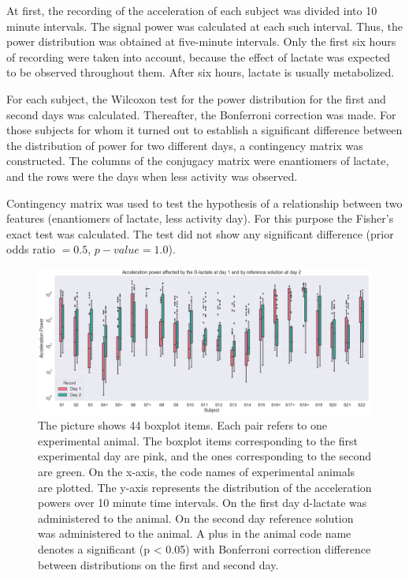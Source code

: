 \documentclass[14pt,a4paper]{scrartcl}
\begin{document}
At first, the recording of the acceleration of each subject was divided into 10 minute intervals. The signal power was calculated at each such interval. Thus, the power distribution was obtained at five-minute intervals. Only the first six hours of recording were taken into account, because the effect of lactate was expected to be observed throughout them. After six hours, lactate is usually metabolized. 

For each subject, the Wilcoxon test for the power distribution for the first and second days was calculated. Thereafter, the Bonferroni correction was made. For those subjects for whom it turned out to establish a significant difference between the distribution of power for two different days, a contingency matrix was constructed. The columns of the conjugacy matrix were enantiomers of lactate, and the rows were the days when less activity was observed.

Contingency matrix was used to test the hypothesis of a relationship between two features (enantiomers of lactate, less activity day). For this purpose the Fisher's exact test was calculated. The test did not show any significant difference (prior odds ratio $= 0.5$, $p-value = 1.0$). 


\begin{figure}[H]
\centering
\includegraphics[width=\linewidth]{exp4_2.png}
\caption{
  The picture shows 44 boxplot items. Each pair refers to one experimental animal. The boxplot items corresponding to the first experimental day are pink, and the ones corresponding to the second are green. On the x-axis, the code names of experimental animals are plotted. The y-axis represents the distribution of the acceleration powers over 10 minute time intervals. On the first day d-lactate was administered to the animal. On the second day reference solution was administered to the animal. A plus in the animal code name denotes a significant (p < 0.05) with Bonferroni correction difference between distributions on the first and second day.
}\label{fig:exp4_2}
\end{figure}
\end{document}
